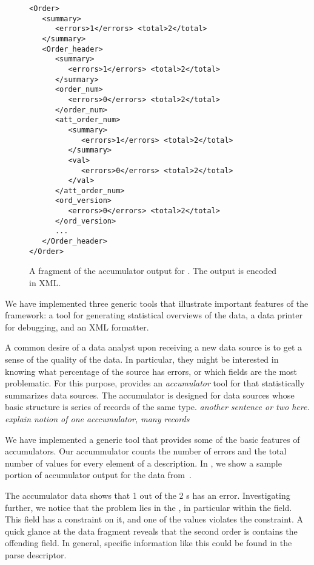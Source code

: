 \begin{figure}
  \centering
  \scriptsize
\begin{verbatim}
<Order>
   <summary>
      <errors>1</errors> <total>2</total>        
   </summary>
   <Order_header>
      <summary>
         <errors>1</errors> <total>2</total>        
      </summary>
      <order_num>
         <errors>0</errors> <total>2</total>        
      </order_num>
      <att_order_num>
         <summary>
            <errors>1</errors> <total>2</total>        
         </summary>
         <val>
            <errors>0</errors> <total>2</total>                
         </val>
      </att_order_num>
      <ord_version>
         <errors>0</errors> <total>2</total>                
      </ord_version>
      ...
   </Order_header>
</Order>
\end{verbatim}  
  \caption{A fragment of the accumulator output for \dibbler{}. The
    output is encoded in XML.}
  \label{fig:gentool-acc-output}
\end{figure}

We have implemented three generic tools that illustrate important
features of the framework: a tool for generating statistical
overviews of the data, a data printer for debugging, and an XML
formatter.

A common desire of a data analyst upon receiving a new data source is
to get a sense of the quality of the data. In particular, they might
be interested in knowing what percentage of the source has errors, or
which fields are the most problematic. For this purpose, \padsc{}
provides an \emph{accumulator} tool for \padsc{} that statistically
summarizes data sources. The accumulator is designed for data sources
whose basic structure is series of records of the same type.
\emph{another sentence or two here. explain notion of one
  acccumulator, many records}

We have implemented a generic tool that provides some of the basic
features of \padsc{} accumulators. Our accummulator counts the number
of errors and the total number of values for every element of a
description. In , we show a sample
portion of accumulator output for the \dibbler{} data
from~.

The accumulator data shows that 1 out of the 2 s has an
error. Investigating further, we notice that the problem lies in the
, in particular within the  field.
This field has a constraint on it, and one of the values violates the
constraint. A quick glance at the data fragment reveals that the
second order is contains the offending field. In general, specific
information like this could be found in the parse descriptor.

